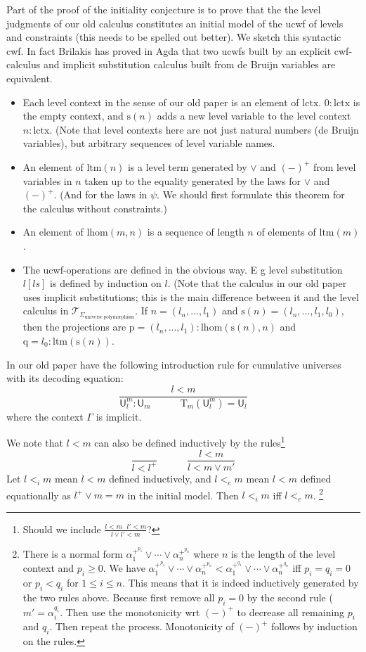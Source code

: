 \documentclass[11pt,a4paper]{article}
\theoremstyle{definition}
\newcommand{\UU}{\mathsf{U}}
\def\lhom{\mathrm{lhom}}
\def\UU{\mathsf{U}}
\newcommand{\T}{\mathsf{T}}
\def\lctx{\mathrm{lctx}}
\def\ltm{\mathrm{ltm}}
\def\s{\mathrm{s}}
\def\p{\mathrm{p}}
\def\q{\mathrm{q}}
\def\T{\mathcal{T}}
\newcommand{\Ta}{\mathrm{T}}
\begin{document}
Part of the proof of the initiality conjecture is to prove that the the level judgments of our old calculus constitutes an initial model of the ucwf of levels and constraints (this needs to be spelled out better). We sketch this syntactic cwf. In fact Brilakis has proved in Agda that two ucwfs built by an explicit cwf-calculus and implicit substitution calculus built from de Bruijn variables are equivalent. 
\begin{itemize}
\item Each level context in the sense of our old paper is an element of $\lctx$. $0 : \lctx$ is the empty context, and $\s(n)$ adds a new level variable to the level context $n : \lctx$. (Note that level contexts here are not just natural numbers (de Bruijn variables), but arbitrary sequences of level variable names.
\item An element of $\ltm(n)$ is a level term generated by $\vee$ and $(-)^+$ from level variables in $n$ taken up to the equality generated by the laws for
$\vee$ and $(-)^+$. (And for the laws in $\psi$. We should first formulate this theorem for the calculus without constraints.)
 \item An element of $\lhom(m,n)$ is a sequence of length $n$ of elements of $\ltm(m)$.
 \item The ucwf-operations are defined in the obvious way. E g level substitution $l[ls]$ is defined by induction on $l$. (Note that the calculus in our old paper uses implicit substitutions; this is the main difference between it and the level calculus in $\T_{\Sigma_{\mathrm{universe\ polymorphism}}}$. If $n = (l_n, \ldots, l_1)$ and $\s(n) =  (l_n, \ldots, l_1, l_0)$, then the projections are  $\p = (l_n, \ldots, l_1) : \lhom(\s(n),n)$ and $\q = l_0 : \ltm(\s(n))$.
\end{itemize}
In our old paper have the following introduction rule for cumulative universes with its decoding equation:
$$
\frac{l < m}
{\UU^m_l : \UU_m\hspace{3em}\Ta_m(\UU^m_l) = \UU_l}
$$
where the context $\Gamma$ is implicit.

We note that $l < m$ can also be defined inductively by the rules\footnote{Should we include $\frac{l < m\ \ \ l'<m}{l \vee l'  < m}$?}
$$
\frac{}{l < l^+}
\hspace{3em}
\frac{l < m}{l < m \vee m'}
$$
Let $l <_i m$ mean $l < m$ defined inductively, and  $l <_e m$ mean $l < m$ defined equationally as $l^+ \vee m = m$ in the initial model. Then $l <_i m$ iff $l <_e m$.
\footnote{There is a normal form 
$\alpha_1^{+^{p_1}} \vee \cdots \vee \alpha_n^{+^{p_n}}$ where $n$ is the length of the level context and $p_i \geq 0$. We have $\alpha_1^{+^{p_1}} \vee \cdots \vee \alpha_n^{+^{p_n}} < \alpha_1^{+^{q_1}} \vee \cdots \vee \alpha_n^{+^{q_n}}$ iff $p_i = q_i = 0$ or $p_i < q_i$ for $1 \le i \le n$. This means that it is indeed inductively generated by the two rules above. Because first remove all $p_i = 0$ by the second rule ($m' = \alpha_i^{q_i}$. Then use the monotonicity wrt $(-)^+$ to decrease all remaining $p_i$ and $q_i$. Then repeat the process. Monotonicity of $(-)^+$ follows by induction on the rules.}
\end{document}
